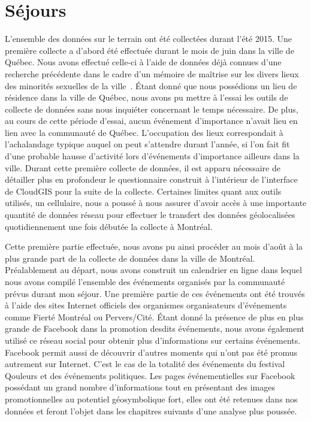 \section{Séjours}
\label{sec:s_jours}
L'ensemble des données sur le terrain ont été collectées durant l'été 2015.
Une première collecte a d'abord été effectuée durant le mois de juin dans la ville de Québec.
Nous avons effectué celle-ci à l'aide de données déjà connues d'une recherche précédente dans le cadre d'un mémoire de maîtrise sur les divers lieux des minorités sexuelles de la ville~\citep{Vachon2014}.
Étant donné que nous possédions un lieu de résidence dans la ville de Québec, nous avons pu mettre à l'essai les outils de collecte de données sans nous inquiéter concernant le temps nécessaire.
De plus, au cours de cette période d'essai, aucun événement d'importance n'avait lieu en lien avec la communauté \lgbt{} de Québec.
L'occupation des lieux correspondait à l'achalandage typique auquel on peut s'attendre durant l'année, si l'on fait fit d'une probable hausse d'activité lors d'événements d'importance ailleurs dans la ville.
Durant cette première collecte de données, il est apparu nécessaire de détailler plus en profondeur le questionnaire construit à l'intérieur de l'interface de CloudGIS pour la suite de la collecte.
Certaines limites quant aux outils utilisés, un cellulaire, nous a poussé à nous assurer d'avoir accès à une importante quantité de données réseau pour effectuer le transfert des données géolocalisées quotidiennement une fois débutée la collecte à Montréal.

Cette première partie effectuée, nous avons pu ainsi procéder au mois d'août à la plus grande part de la collecte de données dans la ville de Montréal.
Préalablement au départ, nous avons construit un calendrier en ligne dans lequel nous avons compilé l'ensemble des événements organisés par la communauté \lgbt{} prévus durant mon séjour.
Une première partie de ces événements ont été trouvés à l'aide des sites Internet officiels des organismes organisateurs d'événements comme Fierté Montréal ou Pervers/Cité.
Étant donné la présence de plus en plus grande de Facebook dans la promotion desdits événements, nous avons également utilisé ce réseau social pour obtenir plus d'informations sur certains événements.
Facebook permit aussi de découvrir d'autres moments qui n'ont pas été promus autrement sur Internet.
C'est le cas de la totalité des événements du festival Qouleurs et des événements politiques.
Les pages événementielles sur Facebook possédant un grand nombre d'informations tout en présentant des images promotionnelles au potentiel géosymbolique fort, elles ont été retenues dans nos données et feront l'objet dans les chapitres suivants d'une analyse plus poussée.

